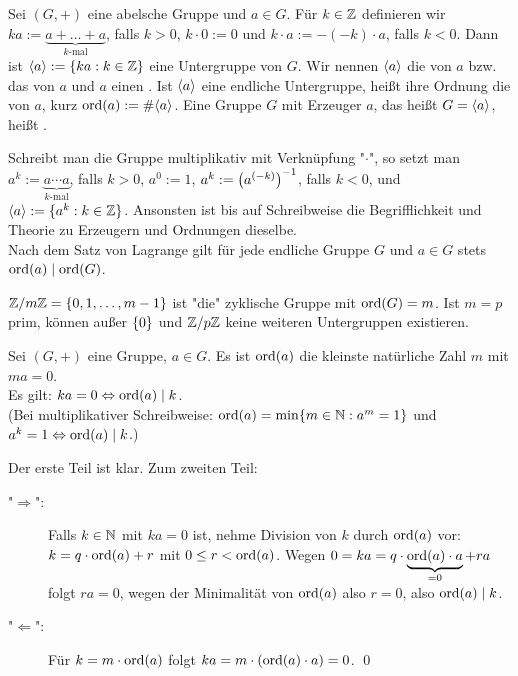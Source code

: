\begin{defn}
	Sei $(G,+)$ eine abelsche Gruppe und $a \in G$. 
	Für $k \in \ZZ$ definieren wir $ka := \underbrace{a + \dots + a}_{k\text{-mal}}$, falls $k > 0$, $k \cdot 0 := 0$ und $k \cdot a := -(-k)\cdot a$, falls $k < 0$. 
	Dann ist $\sprod{a} := \{ka : k \in \ZZ\}$ eine Untergruppe von $G$. Wir nennen $\sprod{a}$ die von $a$  bzw. das  von $a$ und $a$ einen . 
	Ist $\sprod{a}$ eine endliche Untergruppe, heißt ihre Ordnung die  von $a$, kurz $\ord(a) := \#\sprod{a}$. 
	Eine Gruppe $G$ mit Erzeuger $a$, das heißt $G = \sprod{a}$, heißt .
\end{defn}

Schreibt man die Gruppe multiplikativ mit Verknüpfung "$\cdot$", so setzt man $a^k := \underbrace{a \cdots a}_{k\text{-mal}}$, falls $k > 0$, $a^0 := 1$, $a^k := \enbrace*{a^{(-k)}}^{-1}$, falls $k < 0$, und $\sprod{a} := \{a^k : k \in \ZZ\}$. 
Ansonsten ist bis auf Schreibweise die Begrifflichkeit und Theorie zu Erzeugern und Ordnungen dieselbe. \\
Nach dem Satz von Lagrange gilt für jede endliche Gruppe $G$ und $a \in G$ stets $\ord(a) \mid \ord(G)$.

\begin{bsp}
	$\ZZ/m\ZZ = \{0,1, \dots, m-1\}$ ist "die" zyklische Gruppe mit $\ord(G) = m$. 
	Ist $m = p$ prim, können außer $\setnull$ und $\ZZ/p\ZZ$ keine weiteren Untergruppen existieren.
\end{bsp}

\begin{lemma}
\label{lemma_1.1.3.6}
	Sei $(G,+)$ eine Gruppe, $a \in G$. 
	Es ist $\ord(a)$ die kleinste natürliche Zahl $m$ mit $ma = 0$. \\
	Es gilt: $ka = 0 \Leftrightarrow \ord(a) \mid k$. \\
	(Bei multiplikativer Schreibweise: $\ord(a) = \min\{m \in \NN : a^m = 1\}$ und $a^k = 1 \Leftrightarrow \ord(a) \mid k$.)
\end{lemma}

	Der erste Teil ist klar. 
	Zum zweiten Teil:
	\begin{description}
		\item["$\Rightarrow$":] Falls $k \in \NN$ mit $ka = 0$ ist, nehme Division von $k$ durch $\ord(a)$ vor: $k = q \cdot \ord(a) + r$ mit $0 \leq r < \ord(a)$. 
		Wegen $0 = ka = q \cdot \underbrace{\ord(a) \cdot a}_{=0} + ra$ folgt $ra = 0$, wegen der Minimalität von $\ord(a)$ also $r=0$, also $\ord(a) \mid k$.
		\item["$\Leftarrow$":] Für $k = m \cdot \ord(a)$ folgt $ka = m \cdot (\ord(a) \cdot a) = 0$. \qed
	\end{description}
	
